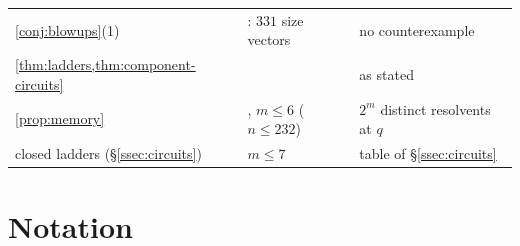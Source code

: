 \begin{center}
\begin{longtable}{@{}L{0.25}L{0.43}L{0.25}@{}}
\cref{conj:blowups}(1) & : $331$ size vectors & no counterexample\\
\cref{thm:ladders,thm:component-circuits} &  & as stated\\
\cref{prop:memory} & , $m\le6$ ($n\le232$) & $2^{m}$ distinct resolvents at $q$\\
closed ladders (\S\ref{ssec:circuits}) & $m\le7$ & table of \S\ref{ssec:circuits}\\
\bottomrule
\end{longtable}
\end{center}

\section{Notation}\label{app:notation}

